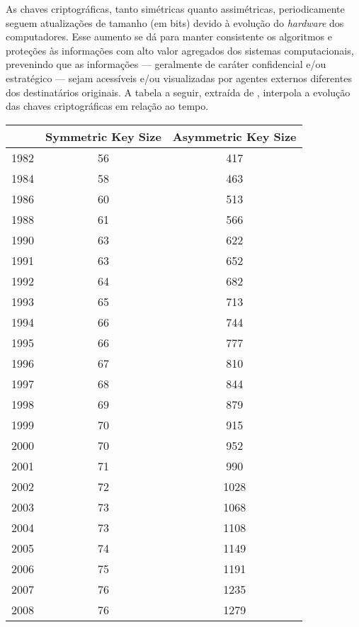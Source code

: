 As chaves criptográficas, tanto simétricas quanto assimétricas, periodicamente seguem atualizações de tamanho (em bits) devido à evolução do \emph{hardware} dos computadores. Esse aumento se dá para manter consistente os algoritmos e proteções às informações com alto valor agregados dos sistemas computacionais, prevenindo que as informações --- geralmente de caráter confidencial e/ou estratégico --- sejam acessíveis e/ou visualizadas por agentes externos diferentes dos destinatários originais. A tabela a seguir, extraída de \cite{key_sizes}, interpola a evolução das chaves criptográficas em relação ao tempo.

\begin{table}
        \begin{tabular}{ccc}
                \toprule
                {\bf Year & Symmetric Key Size & Asymmetric Key Size}\\
                \midrule
                1982 & 56 & 417\\
                1984 & 58 & 463\\
                1986 & 60 & 513\\
                1988 & 61 & 566\\
                1990 & 63 & 622\\
                1991 & 63 & 652\\
                1992 & 64 & 682\\
                1993 & 65 & 713\\
                1994 & 66 & 744\\
                1995 & 66 & 777\\
                1996 & 67 & 810\\
                1997 & 68 & 844\\
                1998 & 69 & 879\\
                1999 & 70 & 915\\
                2000 & 70 & 952\\
                2001 & 71 & 990\\
                2002 & 72 & 1028\\
                2003 & 73 & 1068\\
                2004 & 73 & 1108\\
                2005 & 74 & 1149\\
                2006 & 75 & 1191\\
                2007 & 76 & 1235\\
                2008 & 76 & 1279\\

\end{tabular}
\end{table}
